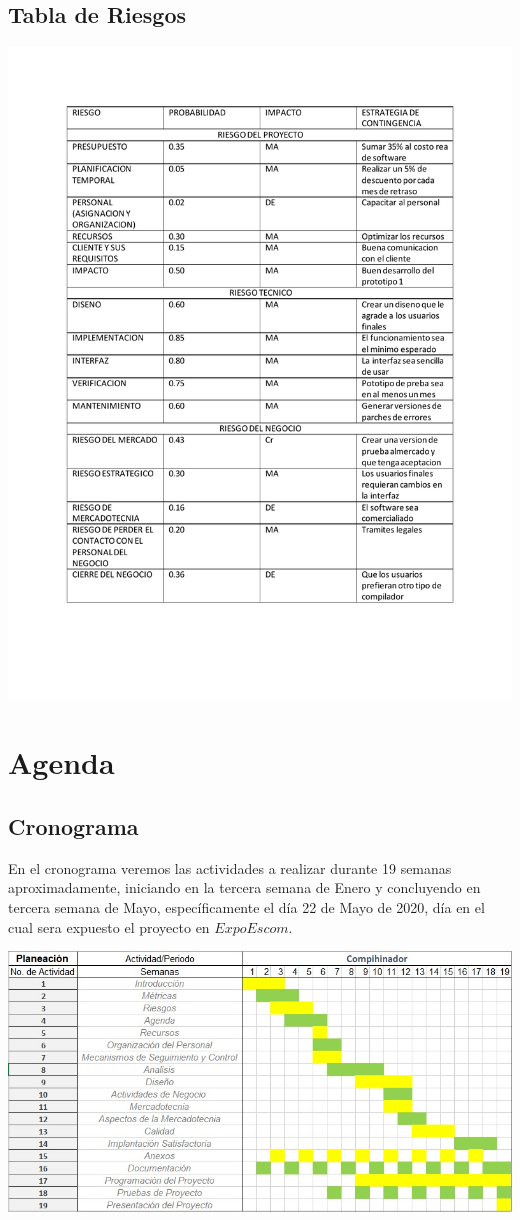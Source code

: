 \documentclass[10pt,executivepaper]{article}
\begin{document}
\subsection{Tabla de Riesgos}
\begin{center}
    \includegraphics[scale=0.75]{sources/Riesgos.pdf}
\end{center}
\section{Agenda}
\subsection{Cronograma}
En el cronograma veremos las actividades a realizar durante 19 semanas aproximadamente, iniciando en la tercera semana de Enero y concluyendo en tercera semana de Mayo, específicamente el día 22 de Mayo de 2020, día en el cual sera expuesto el proyecto en $ExpoEscom$.
\begin{flushright}
\includegraphics[scale=0.7]{imgs/Cronograma.jpg}
\end{flushright}
\end{document}
